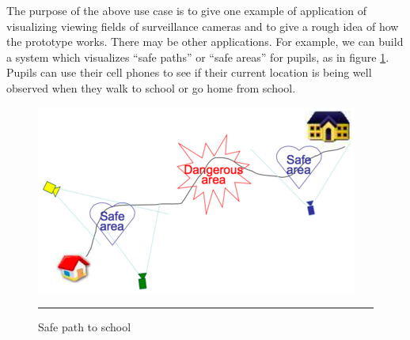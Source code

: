 The purpose of the above use case is to give one example of application of visualizing viewing fields of surveillance cameras and to give a rough idea of how the prototype works. There may be other applications. For example, we can build a system which visualizes ``safe paths'' or ``safe areas'' for pupils, as in figure \ref{fig:HomeSchool}. Pupils can use their cell phones to see if their current location is being well observed when they walk to school or go home from school.

\begin{figure}[htbp]
	\centering
	\includegraphics{./Primitives/home_school.png}
	\rule{35em}{0.5pt}
	\caption[Safe path to school]{Safe path to school}
	\label{fig:HomeSchool}
\end{figure}
